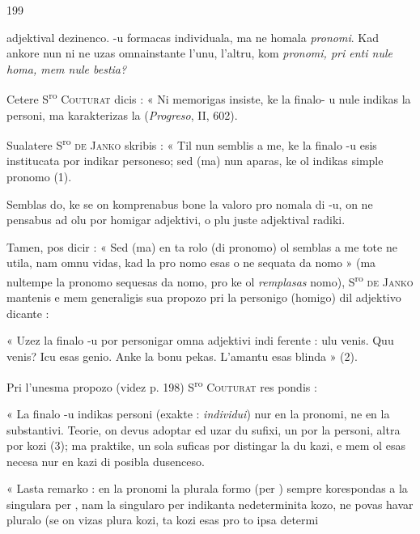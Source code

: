 \begin{VUpage}[203]{199}

\VUcontinue
adjektival dezinenco. -u formacas individuala, ma ne homala\nl
\textit{pronomi}. Kad ankore nun ni ne uzas omnainstante l'unu,\nl
l'altru, kom \textit{pronomi, pri enti nule homa, mem nule bestia?}\parplein

Cetere S\textsuperscript{ro} \textsc{Couturat} dicis : « Ni memorigas insiste, ke la\nl
finalo- u nule indikas la personi, ma karakterizas la \cc
{} (\textit{Progreso}, II, 602).

Sualatere S\textsuperscript{ro} \textsc{de Janko} skribis : « Til nun semblis a me,\nl
ke la finalo -u esis institucata por indikar personeso; sed\nl
(ma) nun aparas, ke ol indikas simple pronomo (1).

Semblas do, ke se on komprenabus bone la valoro pro\cc
nomala di -u, on ne pensabus ad olu por homigar adjektivi,\nl
o plu juste adjektival radiki.

Tamen, pos dicir : « Sed (ma) en ta rolo (di pronomo)\nl
ol semblas a me tote ne utila, nam omnu vidas, kad la pro\cc
nomo esas o ne sequata da nomo » (ma nultempe la\nl
pronomo sequesas da nomo, pro ke ol \textit{remplasas} nomo),\nl
S\textsuperscript{ro} \textsc{de Janko} mantenis e mem generaligis sua propozo pri la\nl
personigo (homigo) dil adjektivo dicante :

« Uzez la finalo -u por personigar omna adjektivi indi\cc
ferente : \textquotesingle{} ulu venis. Quu venis? Icu esas genio. Anke la bonu\nl
pekas. L'amantu esas blinda \textquotesingle{} » (2).

Pri l'unesma propozo (videz p. 198) S\textsuperscript{ro} \textsc{Couturat} res\cc
pondis :

« La finalo -u indikas personi (exakte : \textit{individui}) nur\nl
en la pronomi, ne en la substantivi. Teorie, on devus adoptar\nl
ed uzar du sufixi, un por la personi, altra por kozi (3);\nl
ma praktike, un sola suficas por distingar la du kazi, e mem\nl
ol esas necesa nur en kazi di posibla dusenceso.

« Lasta remarko : en la pronomi la plurala formo (per )\nl
sempre korespondas a la singulara per , nam la singularo\nl
per  indikanta nedeterminita kozo, ne povas havar pluralo\nl
(se on vizas plura kozi, ta kozi esas pro to ipsa determi\cc
\end{VUpage}

